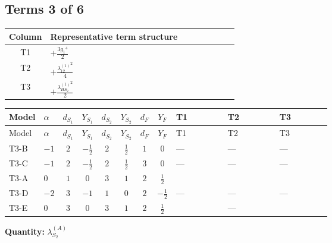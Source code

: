 \documentclass[8pt]{article}
\begin{document}
\begin{landscape}
\subsection*{Terms 3 of 6}
\begin{center}
\begin{tabular}{@{}c >{\raggedright\arraybackslash}p{0.82\linewidth}@{}}
\toprule
Column & Representative term structure \\
\midrule
T1 & \(\displaystyle +\frac{3 {g_1}^4}{2}\) \\
\midrule
T2 & \(\displaystyle +\frac{{\lambda_{12}^{(1)}}^2}{4}\) \\
\midrule
T3 & \(\displaystyle +\frac{{\lambda_{HS_2}^{(1)}}^2}{2}\) \\
\midrule
\bottomrule
\end{tabular}
\end{center}
\smallskip
\tiny
\begin{longtable}{@{}llcccccc >{\raggedright\arraybackslash}p{0.21\linewidth} >{\raggedright\arraybackslash}p{0.21\linewidth} >{\raggedright\arraybackslash}p{0.21\linewidth}@{}}
\toprule
Model & $\alpha$ & $d_{S_1}$ & $Y_{S_1}$ & $d_{S_2}$ & $Y_{S_2}$ & $d_F$ & $Y_F$ & T1 & T2 & T3 \\
\midrule
\endfirsthead
\toprule
Model & $\alpha$ & $d_{S_1}$ & $Y_{S_1}$ & $d_{S_2}$ & $Y_{S_2}$ & $d_F$ & $Y_F$ & T1 & T2 & T3 \\
\midrule
\endhead
T3-B & $-1$ & $2$ & $-\frac{1}{2}$ & $2$ & $\frac{1}{2}$ & $1$ & $0$ & --- & --- & --- \\
\midrule
T3-C & $-1$ & $2$ & $-\frac{1}{2}$ & $2$ & $\frac{1}{2}$ & $3$ & $0$ & --- & --- & --- \\
\midrule
T3-A & $0$ & $1$ & $0$ & $3$ & $1$ & $2$ & $\frac{1}{2}$ & \scriptsize\adjustbox{max width=\linewidth}{$\begin{gathered} +\frac{3 {g_1}^4}{2}\end{gathered}$} & \scriptsize\adjustbox{max width=\linewidth}{$\begin{gathered} +\frac{{\lambda_{12}^{(1)}}^2}{4}\end{gathered}$} & \scriptsize\adjustbox{max width=\linewidth}{$\begin{gathered} +\frac{{\lambda_{HS_2}^{(1)}}^2}{2}\end{gathered}$} \\
\midrule
T3-D & $-2$ & $3$ & $-1$ & $1$ & $0$ & $2$ & $-\frac{1}{2}$ & --- & --- & --- \\
\midrule
T3-E & $0$ & $3$ & $0$ & $3$ & $1$ & $2$ & $\frac{1}{2}$ & \scriptsize\adjustbox{max width=\linewidth}{$\begin{gathered} +\frac{3 {g_1}^4}{2}\end{gathered}$} & --- & \scriptsize\adjustbox{max width=\linewidth}{$\begin{gathered} +\frac{{\lambda_{HS_2}^{(1)}}^2}{2}\end{gathered}$} \\
\midrule
\bottomrule
\end{longtable}
\clearpage
\noindent\textbf{Quantity: }$\lambda_{S_2}^{(A)}$\par\smallskip

\end{landscape}
\end{document}
